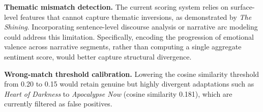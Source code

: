 \documentclass[11pt,a4paper]{article}
\begin{document}
\textbf{Thematic mismatch detection.} The current scoring system relies on surface-level features that cannot capture thematic inversions, as demonstrated by \textit{The Shining}. Incorporating sentence-level discourse analysis or narrative arc modeling could address this limitation. Specifically, encoding the progression of emotional valence across narrative segments, rather than computing a single aggregate sentiment score, would better capture structural divergence.

\textbf{Wrong-match threshold calibration.} Lowering the cosine similarity threshold from 0.20 to 0.15 would retain genuine but highly divergent adaptations such as \textit{Heart of Darkness} to \textit{Apocalypse Now} (cosine similarity 0.181), which are currently filtered as false positives.

\end{document}

